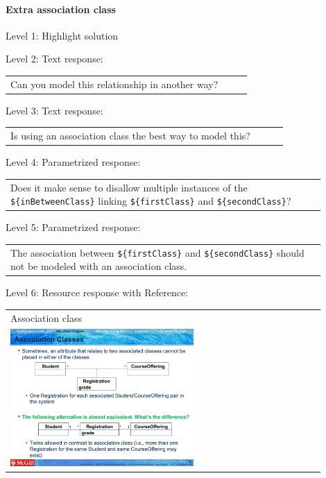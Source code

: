\paragraph{Extra association class}

\noindent Level 1: Highlight solution \medskip

\noindent Level 2: Text response: \medskip

\begin{tabular}{|p{0.9\linewidth}}
Can you model this relationship in another way?
\end{tabular} \medskip

\noindent Level 3: Text response: \medskip

\begin{tabular}{|p{0.9\linewidth}}
Is using an association class the best way to model this?
\end{tabular} \medskip

\noindent Level 4: Parametrized response: \medskip

\begin{tabular}{|p{0.9\linewidth}}
Does it make sense to disallow multiple instances of the \verb|${inBetweenClass}| linking \verb|${firstClass}| and \verb|${secondClass}|?
\end{tabular} \medskip

\noindent Level 5: Parametrized response: \medskip

\begin{tabular}{|p{0.9\linewidth}}
The association between \verb|${firstClass}| and \verb|${secondClass}| should not be modeled with an association class.
\end{tabular} \medskip

\noindent Level 6: Resource response with Reference: \medskip

\begin{tabular}{|p{0.9\linewidth}}
Association class

\\
\includegraphics[width=0.6\textwidth]{images/association_class.png}
\end{tabular} \medskip


